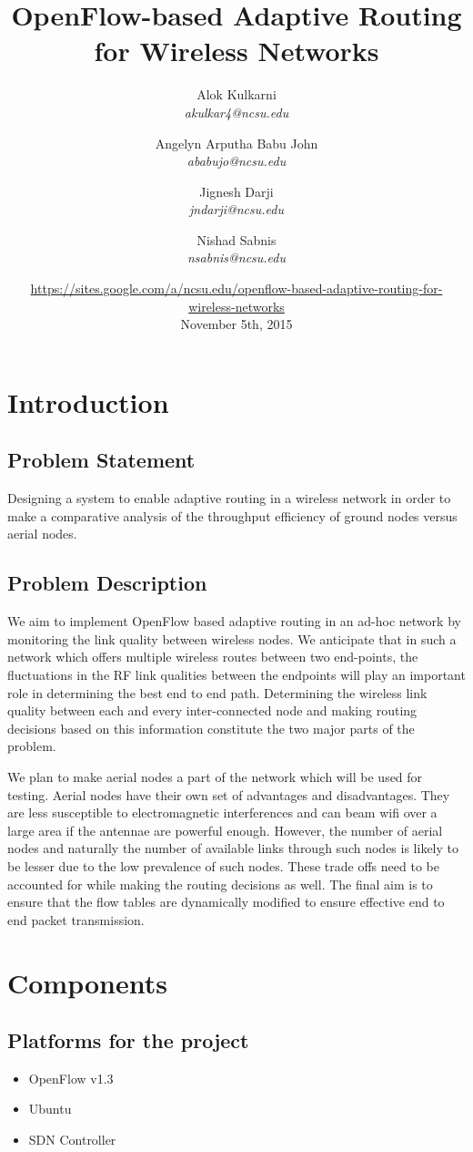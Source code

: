 \documentclass{article}
\title{OpenFlow-based Adaptive Routing for Wireless Networks}
\author{
    Alok Kulkarni \\
    \textit{akulkar4@ncsu.edu}
    \and
    Angelyn Arputha Babu John \\
    \textit{ababujo@ncsu.edu}
    \and
    Jignesh Darji \\
    \textit{jndarji@ncsu.edu}
    \and 
    Nishad Sabnis \\
    \textit{nsabnis@ncsu.edu}
}
\date{
    \small{\url{https://sites.google.com/a/ncsu.edu/openflow-based-adaptive-routing-for-wireless-networks}}\\
    November 5th, 2015}
\begin{document}
\maketitle
\section{Introduction}
\subsection{Problem Statement}
Designing a system to enable adaptive routing in a wireless network in order to make a comparative analysis of the
throughput efficiency of ground nodes versus aerial nodes.
\subsection{Problem Description}
\par We aim to implement OpenFlow based adaptive routing in an ad-hoc network by monitoring the link quality between wireless
nodes. We anticipate that in such a network which offers multiple wireless routes between two end-points, the
fluctuations in the RF link qualities between the endpoints will play an important role in determining the best end to
end path. Determining the wireless link quality between each and every inter-connected node and making routing decisions
based on this information constitute the two major parts of the problem. 
\par We plan to make aerial nodes a part of the network which will be used for testing. Aerial nodes have their own set of
advantages and disadvantages. They are less susceptible to electromagnetic interferences and can beam wifi over a large
area if the antennae are powerful enough. However, the number of aerial nodes and naturally the number of available
links through such nodes is likely to be lesser due to the low prevalence of such nodes. These trade offs need to be
accounted for while making the routing decisions as well. The final aim is to ensure that the flow tables are
dynamically modified to ensure effective end to end packet transmission. 
\section{Components}
\subsection{Platforms for the project}
\begin{itemize}
\item OpenFlow v1.3
\item Ubuntu
\item SDN Controller
\end{itemize}
\end{document}
